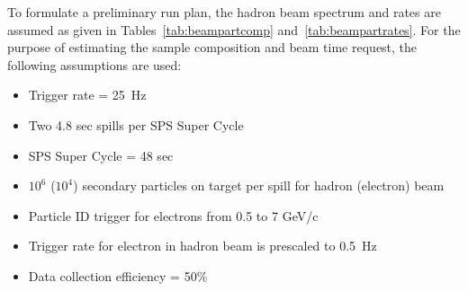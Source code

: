 To formulate a preliminary run plan, %
the hadron beam spectrum and rates are assumed as given in Tables~\ref{tab:beampartcomp} and~\ref{tab:beampartrates}.   For the purpose of estimating the sample composition and beam time request, the following assumptions are used:
\begin{itemize}
\item { Trigger rate = 25~Hz}
\item { Two 4.8 sec spills per SPS Super Cycle }
\item { SPS Super Cycle = 48 sec}
\item { $10^6$ ($10^4$) secondary particles on target per spill for hadron (electron) beam}
\item { Particle ID trigger for electrons from 0.5 to 7 GeV/c}
\item { Trigger rate for electron in hadron beam is prescaled to 0.5~Hz}
\item { Data collection efficiency = 50\%}
\end{itemize}

